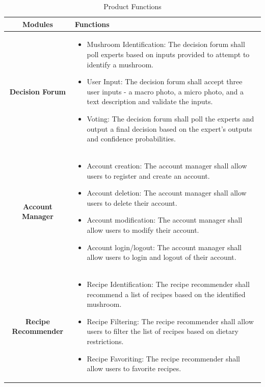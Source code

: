 \documentclass[]{article}
\begin{document}
\begin{table}[H]
	\centering
	
	\label{tab:product_functions}
	\begin{tabular}{|c|p{10cm}|}
		\hline
		\textbf{Modules} & \textbf{Functions} \\
		\hline
		\hline
		\textbf{Decision Forum} & \begin{itemize}
			\item Mushroom Identification: The decision forum shall poll experts based on inputs provided to attempt to identify a mushroom.
			\item User Input: The decision forum shall accept three user inputs - a macro photo, a micro photo, and a text description and validate the inputs.
			\item Voting: The decision forum shall poll the experts and output a final decision based on the expert's outputs and confidence probabilities.
		\end{itemize} \\
		\hline
		\textbf{Account Manager} & \begin{itemize}
			\item Account creation: The account manager shall allow users to register and create an account.
			\item Account deletion: The account manager shall allow users to delete their account.
			\item Account modification: The account manager shall allow users to modify their account.
			\item Account login/logout: The account manager shall allow users to login and logout of their account.
		\end{itemize} \\
		\hline
		\textbf{Recipe Recommender} & \begin{itemize}
			\item Recipe Identification: The recipe recommender shall recommend a list of recipes based on the identified mushroom.
			\item Recipe Filtering: The recipe recommender shall allow users to filter the list of recipes based on dietary restrictions.
			\item Recipe Favoriting: The recipe recommender shall allow users to favorite recipes.
		\end{itemize} \\
		\hline
	\end{tabular}
	\caption{Product Functions}
\end{table}
\end{document}
